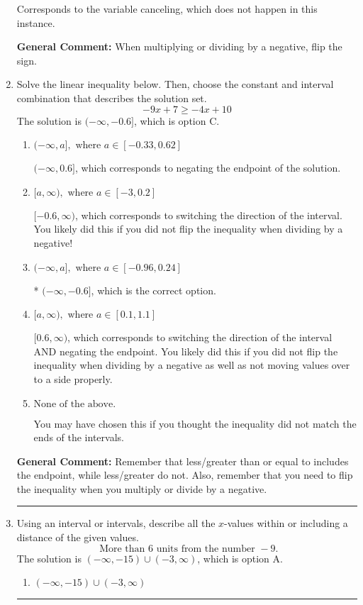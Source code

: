 \documentclass{extbook}[14pt]
\newcommand{\litem}[1]{\item #1

\rule{\textwidth}{0.4pt}}
\begin{document}
\begin{enumerate}
{\begin{enumerate}[label=\Alph*.]
Corresponds to the variable canceling, which does not happen in this instance.
\end{enumerate}

\textbf{General Comment:} When multiplying or dividing by a negative, flip the sign.
}
\litem{
Solve the linear inequality below. Then, choose the constant and interval combination that describes the solution set.
\[ -9x + 7 \geq -4x + 10 \]The solution is \( (-\infty, -0.6] \), which is option C.\begin{enumerate}[label=\Alph*.]
\item \( (-\infty, a], \text{ where } a \in [-0.33, 0.62] \)

 $(-\infty, 0.6]$, which corresponds to negating the endpoint of the solution.
\item \( [a, \infty), \text{ where } a \in [-3, 0.2] \)

 $[-0.6, \infty)$, which corresponds to switching the direction of the interval. You likely did this if you did not flip the inequality when dividing by a negative!
\item \( (-\infty, a], \text{ where } a \in [-0.96, 0.24] \)

* $(-\infty, -0.6]$, which is the correct option.
\item \( [a, \infty), \text{ where } a \in [0.1, 1.1] \)

 $[0.6, \infty)$, which corresponds to switching the direction of the interval AND negating the endpoint. You likely did this if you did not flip the inequality when dividing by a negative as well as not moving values over to a side properly.
\item \( \text{None of the above}. \)

You may have chosen this if you thought the inequality did not match the ends of the intervals.
\end{enumerate}

\textbf{General Comment:} Remember that less/greater than or equal to includes the endpoint, while less/greater do not. Also, remember that you need to flip the inequality when you multiply or divide by a negative.
}
\litem{
Using an interval or intervals, describe all the $x$-values within or including a distance of the given values.
\[ \text{ More than } 6 \text{ units from the number } -9. \]The solution is \( (-\infty, -15) \cup (-3, \infty) \), which is option A.\begin{enumerate}[label=\Alph*.]
\item \( (-\infty, -15) \cup (-3, \infty) \)


\end{enumerate}}
\end{enumerate}
\end{document}
